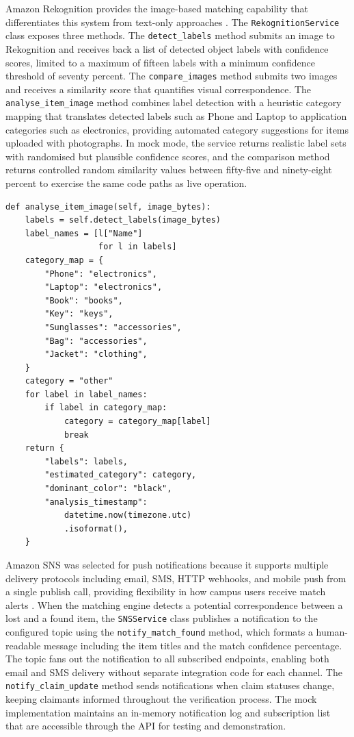 \documentclass[conference]{IEEEtran}
\begin{document}
Amazon Rekognition provides the image-based matching capability that differentiates this system from text-only approaches \cite{awsrekognition}. The \texttt{RekognitionService} class exposes three methods. The \texttt{detect\_labels} method submits an image to Rekognition and receives back a list of detected object labels with confidence scores, limited to a maximum of fifteen labels with a minimum confidence threshold of seventy percent. The \texttt{compare\_images} method submits two images and receives a similarity score that quantifies visual correspondence. The \texttt{analyse\_item\_image} method combines label detection with a heuristic category mapping that translates detected labels such as Phone and Laptop to application categories such as electronics, providing automated category suggestions for items uploaded with photographs. In mock mode, the service returns realistic label sets with randomised but plausible confidence scores, and the comparison method returns controlled random similarity values between fifty-five and ninety-eight percent to exercise the same code paths as live operation.

\begin{lstlisting}[caption={Rekognition service item image analysis}]
def analyse_item_image(self, image_bytes):
    labels = self.detect_labels(image_bytes)
    label_names = [l["Name"]
                   for l in labels]
    category_map = {
        "Phone": "electronics",
        "Laptop": "electronics",
        "Book": "books",
        "Key": "keys",
        "Sunglasses": "accessories",
        "Bag": "accessories",
        "Jacket": "clothing",
    }
    category = "other"
    for label in label_names:
        if label in category_map:
            category = category_map[label]
            break
    return {
        "labels": labels,
        "estimated_category": category,
        "dominant_color": "black",
        "analysis_timestamp":
            datetime.now(timezone.utc)
            .isoformat(),
    }
\end{lstlisting}

Amazon SNS was selected for push notifications because it supports multiple delivery protocols including email, SMS, HTTP webhooks, and mobile push from a single publish call, providing flexibility in how campus users receive match alerts \cite{sns}. When the matching engine detects a potential correspondence between a lost and a found item, the \texttt{SNSService} class publishes a notification to the configured topic using the \texttt{notify\_match\_found} method, which formats a human-readable message including the item titles and the match confidence percentage. The topic fans out the notification to all subscribed endpoints, enabling both email and SMS delivery without separate integration code for each channel. The \texttt{notify\_claim\_update} method sends notifications when claim statuses change, keeping claimants informed throughout the verification process. The mock implementation maintains an in-memory notification log and subscription list that are accessible through the API for testing and demonstration.
\end{document}
